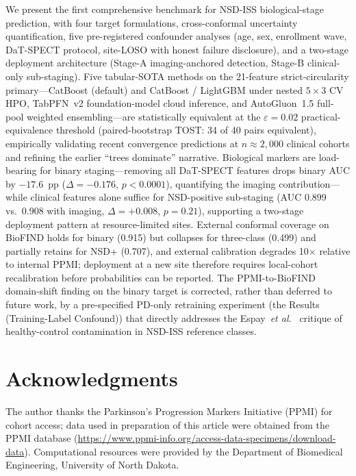 \documentclass[10pt,letterpaper]{article}
\begin{document}
We present the first comprehensive benchmark for NSD-ISS biological-stage prediction, with four target formulations, cross-conformal uncertainty quantification, five pre-registered confounder analyses (age, sex, enrollment wave, DaT-SPECT protocol, site-LOSO with honest failure disclosure), and a two-stage deployment architecture (Stage-A imaging-anchored detection, Stage-B clinical-only sub-staging). Five tabular-SOTA methods on the 21-feature strict-circularity primary---CatBoost (default) and CatBoost / LightGBM under nested $5{\times}3$ CV HPO, TabPFN~v2 foundation-model cloud inference, and AutoGluon~1.5 full-pool weighted ensembling---are statistically equivalent at the $\varepsilon{=}0.02$ practical-equivalence threshold (paired-bootstrap TOST: 34 of 40 pairs equivalent), empirically validating recent convergence predictions at $n \approx 2{,}000$ clinical cohorts and refining the earlier ``trees dominate'' narrative. Biological markers are load-bearing for binary staging---removing all DaT-SPECT features drops binary AUC by $-17.6$~pp ($\Delta{=}-0.176$, $p{<}0.0001$), quantifying the imaging contribution---while clinical features alone suffice for NSD-positive sub-staging (AUC 0.899 vs.\ 0.908 with imaging, $\Delta{=}+0.008$, $p{=}0.21$), supporting a two-stage deployment pattern at resource-limited sites. External conformal coverage on BioFIND holds for binary (0.915) but collapses for three-class (0.499) and partially retains for NSD+ (0.707), and external calibration degrades 10$\times$ relative to internal PPMI; deployment at a new site therefore requires local-cohort recalibration before probabilities can be reported. The PPMI-to-BioFIND domain-shift finding on the binary target is corrected, rather than deferred to future work, by a pre-specified PD-only retraining experiment (the Results (Training-Label Confound)) that directly addresses the Espay~\textit{et al.}~\cite{espay2025med} critique of healthy-control contamination in NSD-ISS reference classes.



\section*{Acknowledgments}
The author thanks the Parkinson's Progression Markers Initiative (PPMI) for cohort access; data used in preparation of this article were obtained from the PPMI database (\url{https://www.ppmi-info.org/access-data-specimens/download-data}). Computational resources were provided by the Department of Biomedical Engineering, University of North Dakota.
\end{document}

